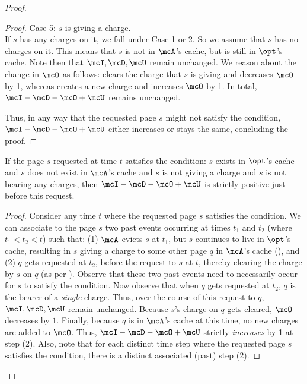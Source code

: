 \documentclass[11pt]{article}
\begin{document}
\begin{proof}
\begin{proof}
        \medskip
        \noindent\underline{Case 5: $s$ is giving a charge.} \\
        If $s$ has any charges on it, we fall under Case 1 or 2. So we assume that $s$ has no charges on it. This means that $s$ is not in $\mcA$'s cache, but is still in $\opt$'s cache. Note then that $\mcI, \mcD, \mcU$ remain unchanged. We reason about the change in $\mcO$ as follows:  clears the charge that $s$ is giving and decreases $\mcO$ by 1, whereas  creates a new charge and increases $\mcO$ by 1. In total, $\mcI-\mcD-\mcO+\mcU$ remains unchanged.

        Thus, in any way that the requested page $s$ might not satisfy the condition, $\mcI-\mcD-\mcO+\mcU$ either increases or stays the same, concluding the proof.
    \end{proof}

    \begin{claim}
        If the page $s$ requested at time $t$ satisfies the condition: $s$ exists in $\opt$'s cache and $s$ does not exist in $\mcA$'s cache and $s$ is not giving a charge and $s$ is not bearing any charges, then $\mcI-\mcD-\mcO+\mcU$ is strictly positive just before this request.
    \end{claim}
    \begin{proof}
        Consider any time $t$ where the requested page $s$ satisfies the condition. We can associate to the page $s$ two past events occurring at times $t_1$ and $t_2$ (where $t_1 < t_2 < t$) such that: (1) $\mcA$ evicts $s$ at $t_1$, but $s$ continues to live in $\opt$'s cache, resulting in $s$ giving a charge to some other page $q$ in $\mcA$'s cache (), and (2) $q$ gets requested at $t_2$, before the request to $s$ at $t$, thereby clearing the charge by $s$ on $q$ (as per ). Observe that these two past events need to necessarily occur for $s$ to satisfy the condition. Now observe that when $q$ gets requested at $t_2$, $q$ is the bearer of a \textit{single} charge. Thus, over the course of this request to $q$, $\mcI, \mcD, \mcU$ remain unchanged. Because $s$'s charge on $q$ gets cleared, $\mcO$ decreases by $1$. Finally, because $q$ is in $\mcA$'s cache at this time, no new charges are added to $\mcO$. Thus, $\mcI - \mcD - \mcO + \mcU$ strictly \textit{increases} by 1 at step (2). Also, note that for each distinct time step where the requested page $s$ satisfies the condition, there is a distinct associated (past) step (2).
              



\end{proof}
\end{proof}
\end{document}
